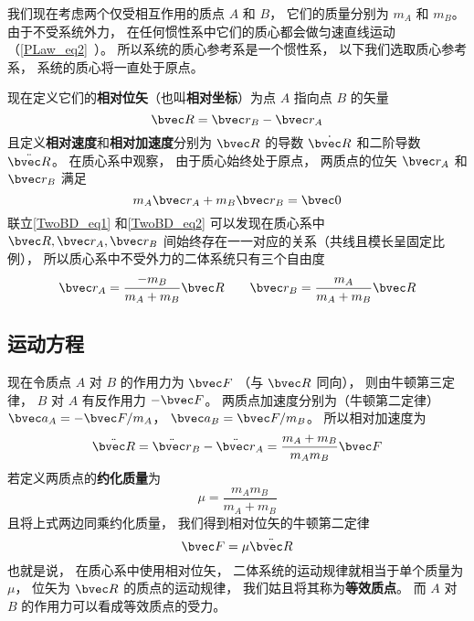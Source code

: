 

我们现在考虑两个仅受相互作用的质点 $A$ 和 $B$， 它们的质量分别为 $m_A$ 和 $m_B$。 由于不受系统外力， 在任何惯性系中它们的质心都会做匀速直线运动（\autoref{PLaw_eq2}~）。 所以系统的质心参考系是一个惯性系， 以下我们选取质心参考系， 系统的质心将一直处于原点。

现在定义它们的\textbf{相对位矢}（也叫\textbf{相对坐标}）为点 $A$ 指向点 $B$ 的矢量
\begin{equation}\label{TwoBD_eq1}
\bvec R = \bvec r_B - \bvec r_A
\end{equation}
且定义\textbf{相对速度}和\textbf{相对加速度}分别为 $\bvec R$ 的导数 $\dot{\bvec R}$ 和二阶导数 $\ddot{\bvec R}$。
在质心系中观察， 由于质心始终处于原点， 两质点的位矢 $\bvec r_A$ 和 $\bvec r_B$ 满足
\begin{equation}\label{TwoBD_eq2}
m_A \bvec r_A + m_B \bvec r_B = \bvec 0
\end{equation}
联立\autoref{TwoBD_eq1} 和\autoref{TwoBD_eq2} 可以发现在质心系中 $\bvec R, \bvec r_A, \bvec r_B$ 间始终存在一一对应的关系（共线且模长呈固定比例）， 所以质心系中不受外力的二体系统只有三个自由度
\begin{equation}\label{TwoBD_eq3}
\bvec r_A = \frac{-m_B}{m_A + m_B} \bvec R \qquad
\bvec r_B = \frac{m_A}{m_A + m_B} \bvec R
\end{equation}

\subsection{运动方程}

现在令质点 $A$ 对 $B$ 的作用力为 $\bvec F$ （与 $\bvec R$ 同向）， 则由牛顿第三定律， $B$ 对 $A$ 有反作用力 $- \bvec F$。 两质点加速度分别为（牛顿第二定律） $\bvec a_A =  -\bvec F/m_A$， $\bvec a_B =  \bvec F/m_B$。 所以相对加速度为
\begin{equation}
\ddot{\bvec R} = \ddot{\bvec r}_B - \ddot{\bvec r}_A = \frac{m_A+m_B}{m_Am_B} \bvec F
\end{equation}
若定义两质点的\textbf{约化质量}为
\begin{equation}
\mu = \frac{m_A m_B}{m_A + m_B}
\end{equation}
且将上式两边同乘约化质量， 我们得到相对位矢的牛顿第二定律
\begin{equation}\label{TwoBD_eq6}
\bvec F = \mu\ddot{\bvec R}
\end{equation}
也就是说， 在质心系中使用相对位矢， 二体系统的运动规律就相当于单个质量为 $\mu$， 位矢为 $\bvec R$ 的质点的运动规律， 我们姑且将其称为\textbf{等效质点}。 而 $A$ 对 $B$ 的作用力可以看成等效质点的受力。

